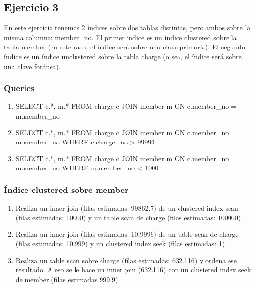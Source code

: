 
\subsection{Ejercicio 3}

En este ejercicio tenemos 2 índices sobre dos tablas distintas, pero ambos sobre la misma columna: member\_no. El primer índice es un índice clustered sobre la tabla member (en este caso, el índice será sobre una clave primaria). El segundo índice es un índice unclustered sobre la tabla charge (o sea, el índice será sobre una clave foránea).

\subsubsection{Queries}

\begin{enumerate}[label=(\alph*)]
\item SELECT c.*, m.* FROM charge c JOIN member m ON c.member\_no = m.member\_no
\item SELECT c.*, m.* FROM charge c JOIN member m ON c.member\_no = m.member\_no WHERE c.charge\_no > 99990
\item SELECT c.*, m.* FROM charge c JOIN member m ON c.member\_no = m.member\_no WHERE m.member\_no < 1000
\end{enumerate}

\subsubsection{Índice clustered sobre member}
\begin{enumerate}[label=(\alph*)]
  \item Realiza un inner join (filas estimadas: 99862.7) de un clustered index scan (filas estimadas: 10000) y un table scan de charge (filas estimadas: 100000).
  \item Realiza un inner join (filas estimadas: 10.9999) de un table scan de charge (filas estimadas: 10.999) y un clustered index seek (filas estimadas: 1).
  \item Realiza un table scan sobre charge (filas estimadas: 632.116) y ordena ese resultado. A eso se le hace un inner join (632.116) con un clustered index seek de member (filas estimadas 999.9).
\end{enumerate}

